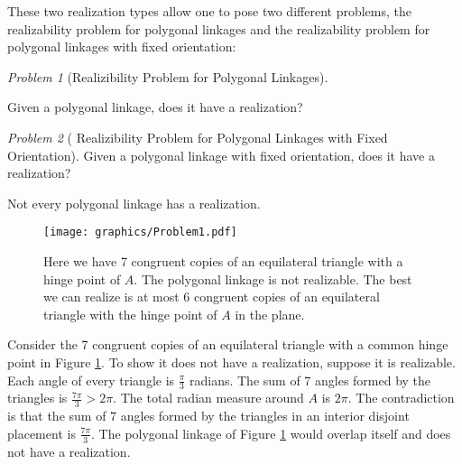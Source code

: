 \documentclass[10pt]{CSUNthesis}
\theoremstyle{plain}%
\theoremstyle{definition}
\theoremstyle{remark}
\newtheorem{prob}{Problem}
\begin{document}
These two realization types allow one to pose two different problems, the realizability problem for polygonal linkages and the realizability problem for polygonal linkages with fixed orientation:
\begin{prob}[Realizibility Problem for Polygonal Linkages]\label{problem:UnorderedPolygonal}

Given a polygonal linkage, does it have a realization?
\end{prob}
\begin{prob}[ Realizibility Problem for Polygonal Linkages with Fixed Orientation]\label{problem:OrderedPolygonal}
Given a polygonal linkage with fixed orientation, does it have a realization?
\end{prob}
Not every polygonal linkage has a realization.
\begin{figure}[!htbp]
\begin{center}
\texttt{[image: graphics/Problem1.pdf]}
\end{center} 
\caption{Here we have 7 congruent copies of an equilateral triangle with a hinge point of $A$.  The polygonal linkage is not realizable.  The best we can realize is at most 6 congruent copies of an equilateral triangle with the hinge point of $A$ in the plane.}
\label{fig:problem1}
\end{figure}
Consider the 7 congruent copies of an equilateral triangle with a common hinge point in Figure \ref{fig:problem1}.
To show it does not have a realization, suppose it is realizable.  
Each angle of every triangle is $\frac{\pi}{3}$ radians.  
The sum of 7 angles formed by the triangles is $\frac{7\pi}{3}>2\pi$.  
The total radian measure around $A$ is $2 \pi$.
The contradiction is that the sum of 7 angles formed by the triangles in an interior disjoint placement is $\frac{7\pi}{3}$.
The polygonal linkage of Figure \ref{fig:problem1} would overlap itself and does not have a realization.
\end{document}
